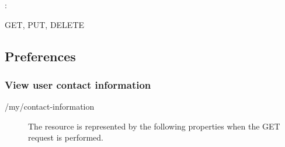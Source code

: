 \documentclass[letterpaper,10pt,english]{sphinxmanual}
\begin{document}
:

\begin{sphinxVerbatim}[commandchars=\\\{\}]
\end{sphinxVerbatim}

 GET, PUT, DELETE


\subsection{Preferences}
\label{\detokenize{restapi:preferences}}

\subsubsection{View user contact information}
\label{\detokenize{restapi:view-user-contact-information}}
 /my/contact-information
\begin{description}
\item[{}] \leavevmode
The resource is represented by the following properties when the GET request is performed.

\end{description}
\end{document}
